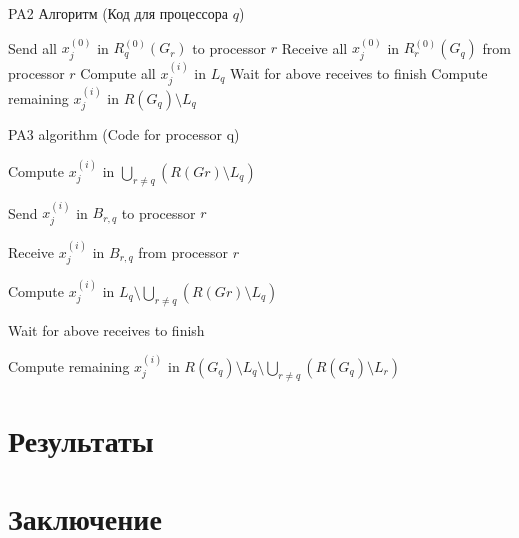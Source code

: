 \documentclass[a4paper,12pt]{report}
\begin{document}
    \begin{algorithm}
    \caption{PA2 Алгоритм (Код для процессора $q$)}
    \label{algo:segment}
    \begin{algorithmic}[1]
            \State Send all $x^{(0)}_j$ in $R^{(0)}_q(G_r)$ to processor $r$
        \EndFor
            \State Receive all $x^{(0)}_j$ in $R^{(0)}_r(G_q)$ from processor $r$
        \EndFor
            \State Compute all $x^{(i)}_j$ in $L_q$
        \EndFor
        \State Wait for above receives to finish
            \State Compute remaining $x^{(i)}_j$ in $R(G_q) \setminus L_q$
        \EndFor
    \end{algorithmic}
    \end{algorithm}

    \begin{algorithm}
    \caption{PA3 algorithm (Code for processor q)}
    \label{algo:PA2}
    \begin{algorithmic}[1]
            \State Compute $x^{(i)}_j$ in $\bigcup_{r \neq q} (R(Gr) \setminus L_q)$
        \EndFor
        
            \State Send $x^{(i)}_j$ in $B_{r,q}$ to processor $r$
        \EndFor
        
            \State Receive $x^{(i)}_j$ in $B_{r,q}$ from processor $r$
        \EndFor
        
            \State Compute $x^{(i)}_j$ in $L_q \setminus \bigcup_{r \neq q} (R(Gr) \setminus L_q)$ 
        \EndFor
        
        \State Wait for above receives to finish
        
            \State Compute remaining $x^{(i)}_j$ in $R(G_q) \setminus L_q \setminus \bigcup_{r \neq q} (R(G_q) \setminus L_r)$
        \EndFor
    \end{algorithmic}
    \end{algorithm}

    \chapter{ Результаты }
    
    
    \chapter{ Заключение }
    
    
\end{document}
